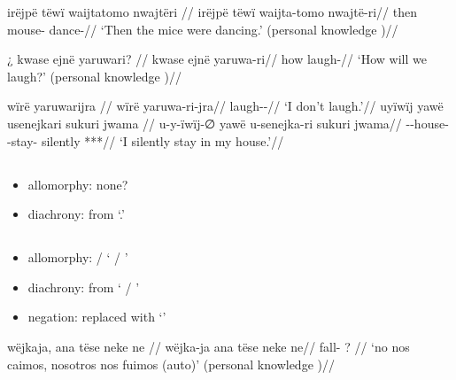 \documentclass{memoir}
\begin{document}
\ex \label{ctorat-16}
\begingl \glpreamble irëjpë tëwï waijtatomo nwajtëri //
\gla irëjpë tëwï waijta-tomo nwajtë-ri//
\glb then  mouse- dance-//
\glft ‘Then the mice were dancing.’ (personal knowledge
)//
\endgl
\xe

\ex \label{convrisamaj-6}
\begingl \glpreamble ¿ kwase ejnë yaruwari? //
\gla kwase ejnë yaruwa-ri//
\glb how  laugh-//
\glft ‘How will we laugh?’ (personal knowledge
)//
\endgl
\xe

\pex\label{gnomicri}    \a     \label{convrisamaj-4}        \begingl
        \glpreamble wïrë yaruwarijra //
        \gla wïrë yaruwa-ri-jra//
        \glb {} laugh--//
            \glft ‘I don’t laugh.’//  
        \endgl 
    \a     \label{convrisamaj-28}        \begingl
        \glpreamble uyïwïj yawë usenejkari sukuri jwama //
        \gla u-y-ïwïj-∅ yawë u-senejka-ri sukuri jwama//
        \glb {}--house-  -stay- silently ***//
            \glft ‘I silently stay in my house.’//  
        \endgl 
\xe

\subsection{\texorpdfstring{}{}}

\begin{itemize}
\tightlist
\item
  allomorphy: none?
\item
  diachrony: from  `.'
\end{itemize}

\subsection{\texorpdfstring{}{}}

\begin{itemize}
\tightlist
\item
  allomorphy: / ` / '
\item
  diachrony: from  ` / '
\item
  negation: replaced with  `' 
\end{itemize}

\ex \label{conv1stenc-28}
\begingl \glpreamble wëjkaja, ana tëse neke ne //
\gla wëjka-ja ana tëse neke ne//
\glb fall-  ?  //
\glft ‘no nos caimos, nosotros nos fuimos (auto)’ (personal knowledge
)//
\endgl
\xe
\end{document}
